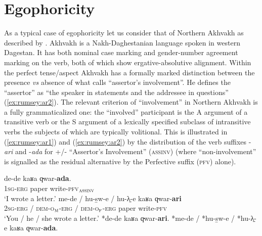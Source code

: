 \documentclass[output=paper]{langsci/langscibook}
\begin{document}
\section{Egophoricity}\label{s:ar2}

As a typical case of egophoricity let us consider that of Northern Akhvakh as described by \cite{Creissels2008}.   Akhvakh is a Nakh-Daghestanian language spoken in western Dagestan. It has both nominal case marking and gender-number agreement marking on the verb, both of which show ergative-absolutive alignment. Within the perfect tense/aspect Akhvakh has a formally marked distinction between the presence \textit{vs} absence of what \citeauthor{Creissels2008} calls “assertor’s involvement”. He defines the “assertor” as “the speaker in statements and the addressee in questions” (\ref{ex:rumsey:ar2}). The relevant criterion of “involvement” in Northern Akhvakh is a fully grammaticalized one: the “involved” participant is the A argument of a transitive verb or the S argument of a lexically specified subclass of intransitive verbs the subjects of which are typically volitional. This is illustrated in (\ref{ex:rumsey:ar1}) and (\ref{ex:rumsey:ar2}) by the distribution of the verb suffixes -\textit{ari} and  -\textit{ada} for +/- “Assertor’s Involvement” (\textsc{assinv})  (where “non-involvement” is signalled as the residual alternative by the Perfective suffix (\textsc{pfv}) alone).

\begin{exe}
	\ex 	\label{ex:rumsey:ar1}
	\begin{xlist}
		\ex \label{ex:rumsey:ar1a}
		\gll de-de kaʁa q̵war-\textbf{ada}.\\
		1\textsc{sg}-\textsc{erg} paper	write-\textsc{pfv}$_{\textsc{assinv}}$\\
		\trans ‘I wrote a letter.’
		\ex \label{ex:rumsey:ar1b}
		\gll me-de / hu-s̱w-e / hu-λ̱-e kaʁa q̵war-\textbf{ari}\\
		2\textsc{sg}-\textsc{erg} / \textsc{dem}-\textsc{o}$_\textsc{m}$-\textsc{erg} / \textsc{dem}-\textsc{o}$_\textsc{f}$-\textsc{erg} paper	write-\textsc{pfv}\\
		\trans ‘You / he / she wrote a letter.’
		\ex \label{ex:rumsey:ar1c} *de-de kaʁa q̵war-\textbf{ari}.
		\ex \label{ex:rumsey:ar1d} *me-de / *hu-s̱w-e / *hu-λ̱-e kaʁa q̵war-\textbf{ada}.\\ \citep[1]{Creissels2008}
	\end{xlist}
\end{exe}
\end{document}
